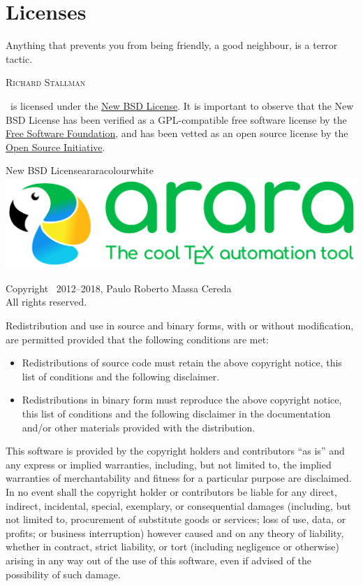 \chapter*{Licenses}
\label{chap:license}

\epigraph{Anything that prevents you from being friendly, a good neighbour, is a terror tactic.}{\textsc{Richard Stallman}}

\arara\ is licensed under the \href{http://www.opensource.org/licenses/bsd-license.php}{New BSD License}. It is important to observe that the New BSD License has been verified as a GPL-compatible free software license by the \href{http://www.fsf.org/}{Free Software Foundation}, and has been vetted as an open source license by the \href{http://www.opensource.org/}{Open Source Initiative}.

\vspace{1em}

\begin{messagebox}{New BSD License}{araracolour}{\icinfo}{white}
\includegraphics[scale=0.25]{../logos/logo1.pdf}

Copyright \textcopyright\ 2012--2018, Paulo Roberto Massa Cereda\\
All rights reserved.

\vspace{1em}

Redistribution and use in source and binary forms, with or without modification, are permitted provided that the following conditions are met:

\begin{itemize}
\item Redistributions of source code must retain the above copyright notice, this list of conditions and the following disclaimer.

\item Redistributions in binary form must reproduce the above copyright notice, this list of conditions and the following disclaimer in the documentation and/or other materials provided with the distribution.
\end{itemize}

This software is provided by the copyright holders and contributors ``as is'' and any express or implied warranties, including, but not limited to, the implied warranties of merchantability and fitness for a particular purpose are disclaimed. In no event shall the copyright holder or contributors be liable for any direct, indirect, incidental, special, exemplary, or consequential damages (including, but not limited to, procurement of substitute goods or services; loss of use, data, or profits; or business interruption) however caused and on any theory of liability, whether in contract, strict liability, or tort (including negligence or otherwise) arising in any way out of the use of this software, even if advised of the possibility of such damage.
\end{messagebox}
